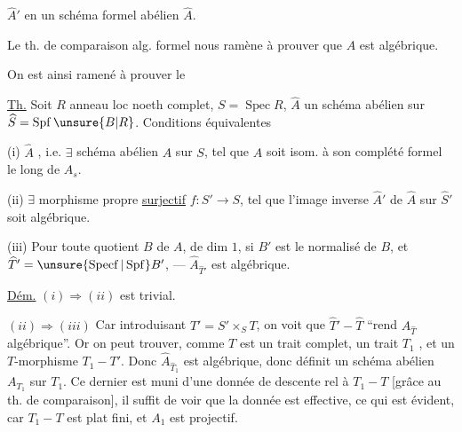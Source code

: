 $\widehat A'$ en un schéma formel abélien $\widehat A$.

Le th. de comparaison alg. formel nous ramène à prouver que $A$ est algébrique.

On est ainsi ramené à prouver le

\uline{Th.} Soit $R$ anneau loc noeth complet, $S=\operatorname{Spec}R$, $\widehat A$ un schéma  abélien sur $\widehat S=\operatorname{Spf}\unsure{B|R}$. Conditions équivalentes

(i) $\widehat A$ , i.e. $\exists$ schéma abélien $A$ sur $S$, tel que $\widehat A$ soit isom. à son complété formel le long de $A_s$.

(ii) $\exists$ morphisme propre \uline{surjectif}  $f:S'\longrightarrow S$,  tel que l'image inverse $\widehat A'$ de $\widehat A$ sur $\widehat S'$ soit algébrique.

(iii) Pour toute  quotient   $B$ de $A$, de dim $1$, si $B'$ est le normalisé de $B$, et  $\widehat T'=\unsure{\operatorname{Specf}|\operatorname{Spf}}B'$, --- $\widehat A_{\widehat T'}$ est algébrique.



\uline{Dém.} $(i)\Longrightarrow(ii)$ est trivial.

$(ii)\Longrightarrow(iii)$ Car introduisant $T'=S'\times_S T$, on voit que $\widehat T'\mathbin{-}\widehat T$ ``rend $\widehat A_{\widehat T}$ algébrique''. Or on peut trouver, comme $T$ est un trait complet, un trait $T_1$  , et un $T$-morphisme $T_1\mathbin{-}T'$. Donc $\widehat A_{\widehat T_1}$ est algébrique, donc définit un schéma abélien $A_{T_1}$ sur $T_1$. Ce dernier est muni d'une donnée de descente rel à $T_1\mathbin{-}T$ [grâce au th. de comparaison], il suffit  de voir que la donnée est effective, ce qui est évident, car $T_1\mathbin{-}T$ est  plat fini, et $A_1$ est projectif.

